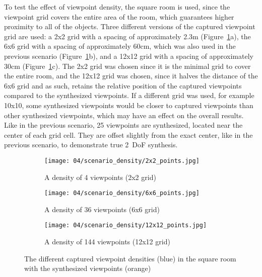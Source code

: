 To test the effect of viewpoint density, the square room is used, since the viewpoint grid covers the entire area of the room, which guarantees higher proximity to all of the objects. Three different versions of the captured viewpoint grid are used: a 2x2 grid with a spacing of approximately 2.3m (Figure~\ref{fig:density_setup}a), the 6x6 grid with a spacing of approximately 60cm, which was also used in the previous scenario (Figure~\ref{fig:density_setup}b), and a 12x12 grid with a spacing of approximately 30cm (Figure~\ref{fig:density_setup}c). The 2x2 grid was chosen since it is the minimal grid to cover the entire room, and the 12x12 grid was chosen, since it halves the distance of the 6x6 grid and as such, retains the relative position of the captured viewpoints compared to the synthesized viewpoints. If a different grid was used, for example 10x10, some synthesized viewpoints would be closer to captured viewpoints than other synthesized viewpoints, which may have an effect on the overall results.
Like in the previous scenario, 25 viewpoints are synthesized, located near the center of each grid cell. They are offset slightly from the exact center, like in the previous scenario, to demonstrate true 2~DoF synthesis.

\begin{figure}
\centering
    \hfill
    \begin{subfigure}[t]{0.3\textwidth}
            \centering
            \texttt{[image: 04/scenario\_density/2x2\_points.jpg]}
            \caption{A density of 4 viewpoints (2x2 grid)}
    \end{subfigure}
    \hfill
    \begin{subfigure}[t]{0.3\textwidth}
            \centering
            \texttt{[image: 04/scenario\_density/6x6\_points.jpg]}
            \caption{A density of 36 viewpoints (6x6 grid)}
    \end{subfigure}
    \hfill
    \begin{subfigure}[t]{0.3\textwidth}
            \centering
            \texttt{[image: 04/scenario\_density/12x12\_points.jpg]}
            \caption{A density of 144 viewpoints (12x12 grid)}
    \end{subfigure}
    \hfill
  \caption[The different captured viewpoint densities in the square room]{The different captured viewpoint densities (blue) in the square room with the synthesized viewpoints (orange)} \label{fig:density_setup}
\end{figure}

